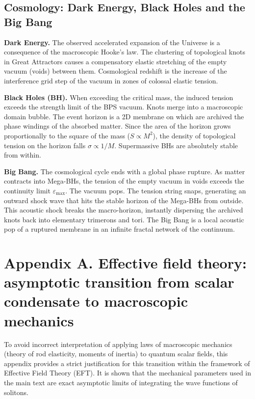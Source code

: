 \documentclass[11pt,a4paper]{article}
\begin{document}
\subsection{Cosmology: Dark Energy, Black Holes and the Big Bang}
\textbf{Dark Energy.} The observed accelerated expansion of the Universe is a consequence of the macroscopic Hooke's law. The clustering of topological knots in Great Attractors causes a compensatory elastic stretching of the empty vacuum (voids) between them. Cosmological redshift is the increase of the interference grid step of the vacuum in zones of colossal elastic tension.

\textbf{Black Holes (BH).} When exceeding the critical mass, the induced tension exceeds the strength limit of the BPS vacuum. Knots merge into a macroscopic domain bubble. The event horizon is a 2D membrane on which are archived the phase windings of the absorbed matter. Since the area of the horizon grows proportionally to the square of the mass ($S \propto M^2$), the density of topological tension on the horizon falls $\sigma \propto 1/M$. Supermassive BHs are absolutely stable from within.

\textbf{Big Bang.} The cosmological cycle ends with a global phase rupture. As matter contracts into Mega-BHs, the tension of the empty vacuum in voids exceeds the continuity limit $\varepsilon_{\text{max}}$. The vacuum pops. The tension string snaps, generating an outward shock wave that hits the stable horizon of the Mega-BHs from outside. This acoustic shock breaks the macro-horizon, instantly dispersing the archived knots back into elementary trimerons and tori. The Big Bang is a local acoustic pop of a ruptured membrane in an infinite fractal network of the continuum.

\section*{Appendix A. Effective field theory: asymptotic transition from scalar condensate to macroscopic mechanics}

To avoid incorrect interpretation of applying laws of macroscopic mechanics (theory of rod elasticity, moments of inertia) to quantum scalar fields, this appendix provides a strict justification for this transition within the framework of Effective Field Theory (EFT). It is shown that the mechanical parameters used in the main text are exact asymptotic limits of integrating the wave functions of solitons.
\end{document}
